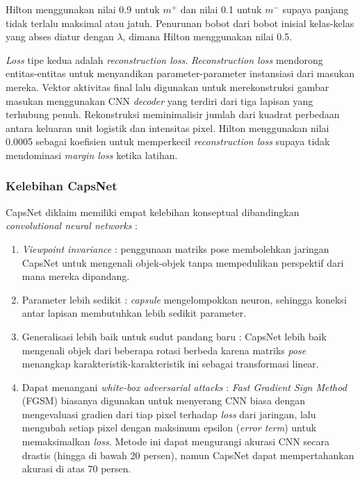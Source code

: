 \documentclass{article}
\begin{document}
		   	
		Hilton menggunakan nilai 0.9 untuk $m^{+}$ dan nilai 0.1 untuk $m^{-}$ supaya panjang tidak terlalu maksimal atau jatuh. Penurunan bobot dari bobot inisial kelas-kelas yang abses diatur dengan $\lambda$, dimana Hilton menggunakan nilai 0.5. 
	   	\par 
	   	\textit{Loss} tipe kedua adalah \textit{reconstruction loss}. \textit{Reconstruction loss} mendorong entitas-entitas untuk  menyandikan parameter-parameter instansiasi dari masukan mereka. Vektor aktivitas final lalu digunakan untuk merekonstruksi gambar masukan menggunakan CNN \textit{decoder} yang terdiri dari tiga lapisan yang terhubung penuh. Rekonstruksi meminimalisir jumlah dari kuadrat perbedaan antara keluaran unit logistik dan intensitas pixel. Hilton menggunakan nilai 0.0005 sebagai koefisien untuk memperkecil \textit{reconstruction loss} supaya tidak mendominasi \textit{margin loss} ketika latihan. 
	   	
	   	\subsubsection{Kelebihan CapsNet}
	   	CapsNet diklaim memiliki empat kelebihan konseptual dibandingkan \textit{convolutional neural networks} :
	   	
	   	\begin{enumerate}
	   	 \item \textit{Viewpoint invariance} : penggunaan matriks pose membolehkan jaringan CapsNet untuk mengenali objek-objek tanpa mempedulikan perspektif dari mana mereka dipandang.
	   	 \item Parameter lebih sedikit : \textit{capsule} mengelompokkan neuron, sehingga koneksi antar lapisan membutuhkan lebih sedikit parameter.
	   	 \item Generalisasi lebih baik untuk sudut pandang baru : CapsNet lebih baik mengenali objek dari beberapa rotasi berbeda karena matriks \textit{pose} menangkap karakteristik-karakteristik ini sebagai transformasi linear.
	   	 \item Dapat menangani \textit{white-box adversarial attacks} : \textit{Fast Gradient Sign Method} (FGSM) biasanya digunakan untuk menyerang CNN biasa dengan mengevaluasi gradien dari tiap pixel terhadap \textit{loss} dari jaringan, lalu mengubah setiap pixel dengan maksimum epsilon (\textit{error term}) untuk memaksimalkan \textit{loss}. Metode ini dapat mengurangi akurasi CNN secara drastis (hingga di bawah 20 persen), namun CapsNet dapat mempertahankan akurasi di atas 70 persen. 
	   	\end{enumerate}
   	
\end{document}
